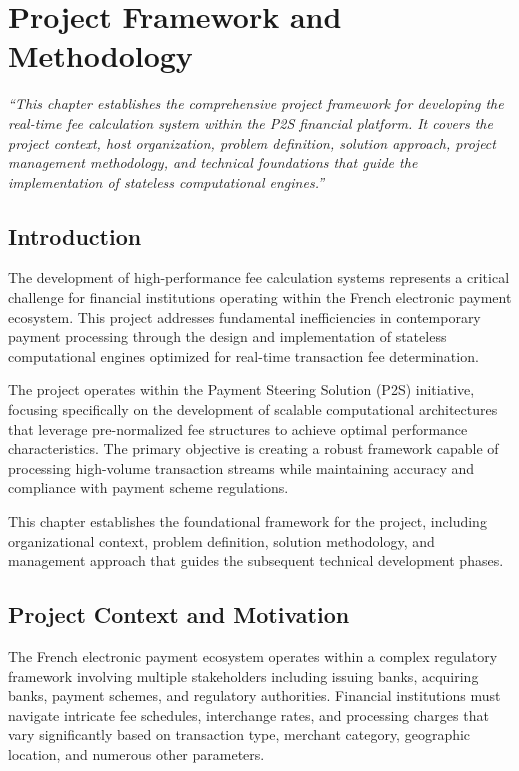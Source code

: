 \chapter{Project Framework and Methodology}\label{chap:project}

\textit{``This chapter establishes the comprehensive project framework for developing the real-time fee calculation system within the P2S financial platform. It covers the project context, host organization, problem definition, solution approach, project management methodology, and technical foundations that guide the implementation of stateless computational engines.''}

\pagebreak

\section{Introduction}

The development of high-performance fee calculation systems represents a critical challenge for financial institutions operating within the French electronic payment ecosystem. This project addresses fundamental inefficiencies in contemporary payment processing through the design and implementation of stateless computational engines optimized for real-time transaction fee determination.

The project operates within the Payment Steering Solution (P2S) initiative, focusing specifically on the development of scalable computational architectures that leverage pre-normalized fee structures to achieve optimal performance characteristics. The primary objective is creating a robust framework capable of processing high-volume transaction streams while maintaining accuracy and compliance with payment scheme regulations.

This chapter establishes the foundational framework for the project, including organizational context, problem definition, solution methodology, and management approach that guides the subsequent technical development phases.

\section{Project Context and Motivation}

The French electronic payment ecosystem operates within a complex regulatory framework involving multiple stakeholders including issuing banks, acquiring banks, payment schemes, and regulatory authorities. Financial institutions must navigate intricate fee schedules, interchange rates, and processing charges that vary significantly based on transaction type, merchant category, geographic location, and numerous other parameters.

